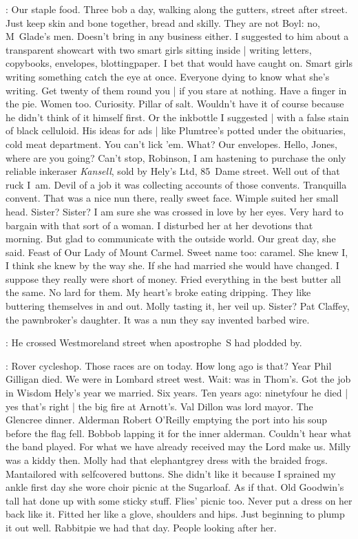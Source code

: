 \BloomInt:
Our staple food.
Three bob a day,
walking along the gutters,
street after street.
Just keep skin and bone together,
bread and skilly.
They are not Boyl:
no, M~Glade's men.
Doesn't bring in any business either.
I suggested to him about a transparent showcart
with two smart girls sitting inside |
writing letters, copybooks, envelopes, blottingpaper.
I bet that would have caught on.
Smart girls writing something catch the eye at once.
Everyone dying to know what she's writing.
Get twenty of them round you |
if you stare at nothing.
Have a finger in the pie.
Women too.
Curiosity.
Pillar of salt.
Wouldn't have it of course
because he didn't think of it himself first.
Or the inkbottle I suggested |
with a false stain of black celluloid.
His ideas for ads |
like Plumtree's potted under the obituaries,
cold meat department.
You can't lick 'em.
What?
Our envelopes.
Hello, Jones, where are you going?
Can't stop, Robinson,
I am hastening to purchase the only reliable inkeraser \emph{Kansell},
sold by Hely's Ltd, 85~Dame street.
Well out of that ruck
I~am.
Devil of a job it was collecting accounts of those convents.
Tranquilla convent.
That was a nice nun there, really sweet face.
Wimple suited her small head.
Sister?
Sister?
I am sure she was crossed in love by her eyes.
Very hard to bargain with that sort of a woman.
I disturbed her at her devotions that morning.
But glad to communicate with the outside world.
Our great day, she said.
Feast of Our Lady of Mount Carmel.
Sweet name too:
caramel.
She knew I,
I think she knew by the way she.
If she had married she would have changed.
I suppose they really were short of money.
Fried everything in the best butter all the same.
No lard for them.
My heart's broke eating dripping.
They like buttering themselves in and out.
Molly tasting it, her veil up.
Sister?
Pat Claffey, the pawnbroker's daughter.
It was a nun they say invented barbed wire.

:
He crossed Westmoreland street
when apostrophe~S had plodded by.

\BloomInt:
Rover cycleshop.
Those races are on today.
How long ago is that?
Year Phil Gilligan died.
We were in Lombard street west.
Wait:
was in Thom's.
Got the job in Wisdom Hely's year we married.
Six years.
Ten years ago:
ninetyfour he died |
yes that's right |
the big fire at Arnott's.
Val Dillon was lord mayor.
The Glencree dinner.
Alderman Robert O'Reilly emptying the port into his soup
before the flag fell.
Bobbob lapping it for the inner alderman.
Couldn't hear what the band played.
For what we have already received may the Lord make us.
Milly was a kiddy then.
Molly had that elephantgrey dress with the braided frogs.
Mantailored with selfcovered buttons.
She didn't like it because I sprained my ankle
first day she wore
choir picnic at the Sugarloaf.
As if that.
Old Goodwin's tall hat done up with some sticky stuff.
Flies' picnic too.
Never put a dress on her back like it.
Fitted her like a glove,
shoulders and hips.
Just beginning to plump it out well.
Rabbitpie we had that day.
People looking after her.


